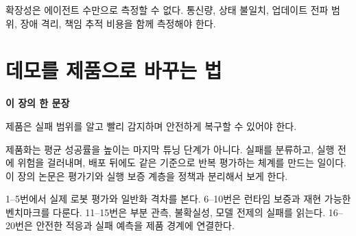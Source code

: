 \documentclass[11pt,openany]{book}
\newcommand{\chaptertakeaway}[1]{%
  \begin{tcolorbox}[
    breakable,
    colback=deepblue,
    colframe=deepblue,
    coltext=white,
    boxrule=0pt,
    arc=2mm,
    left=5mm,right=5mm,top=4mm,bottom=4mm
  ]
  {\sffamily\bfseries\large 이 장의 한 문장}\par\smallskip
  #1
  \end{tcolorbox}
}
\begin{document}
\begin{translationbox}[이 장을 덮기 전에]

확장성은 에이전트 수만으로 측정할 수 없다. 통신량, 상태 불일치, 업데이트 전파 범위, 장애 격리, 책임 추적 비용을 함께 측정해야 한다.

\end{translationbox}

\cleardoublepage

\chapter{데모를 제품으로 바꾸는 법}

\chaptertakeaway{제품은 실패 범위를 알고 빨리 감지하며 안전하게 복구할 수 있어야 한다.}

제품화는 평균 성공률을 높이는 마지막 튜닝 단계가 아니다. 실패를 분류하고, 실행 전에 위험을 걸러내며, 배포 뒤에도 같은 기준으로 반복 평가하는 체계를 만드는 일이다. 이 장의 논문은 평가기와 실행 보증 계층을 정책과 분리해서 보게 한다.

\begin{boardbox}[읽는 순서]

1--5번에서 실제 로봇 평가와 일반화 격차를 본다. 6--10번은 런타임 보증과 재현 가능한 벤치마크를 다룬다. 11--15번은 부분 관측, 불확실성, 모델 전제의 실패를 읽는다. 16--20번은 안전한 적응과 실패 예측을 제품 경계에 연결한다.

\end{boardbox}
\end{document}
